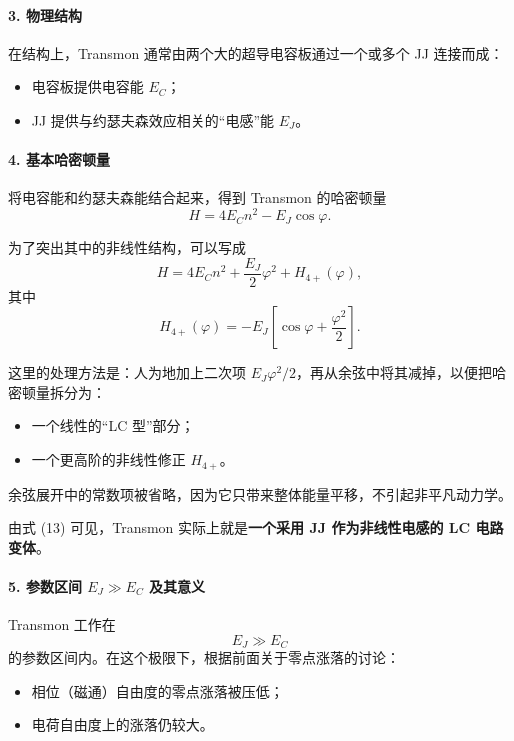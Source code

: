 \documentclass[12pt,a4paper,oneside]{ctexbook}
\begin{document}
\paragraph{3. 物理结构}

在结构上，Transmon 通常由两个大的超导电容板通过一个或多个 JJ 连接而成：
\begin{itemize}[leftmargin=2em]
    \item 电容板提供电容能 \(E_C\)；
    \item JJ 提供与约瑟夫森效应相关的“电感”能 \(E_J\)。
\end{itemize}

\paragraph{4. 基本哈密顿量}

将电容能和约瑟夫森能结合起来，得到 Transmon 的哈密顿量
\begin{equation}
    H=4E_Cn^2-E_J\cos\varphi.
    \tag{13}
\end{equation}

为了突出其中的非线性结构，可以写成
\begin{equation}
    H
    =
    4E_Cn^2+\frac{E_J}{2}\varphi^2+H_{4+}(\varphi),
    \tag{14}
\end{equation}
其中
\[
    H_{4+}(\varphi)
    =
    -E_J\left[\cos\varphi+\frac{\varphi^2}{2}\right].
\]

这里的处理方法是：人为地加上二次项 \(E_J\varphi^2/2\)，再从余弦中将其减掉，以便把哈密顿量拆分为：
\begin{itemize}[leftmargin=2em]
    \item 一个线性的“LC 型”部分；
    \item 一个更高阶的非线性修正 \(H_{4+}\)。
\end{itemize}

余弦展开中的常数项被省略，因为它只带来整体能量平移，不引起非平凡动力学。

由式 (13) 可见，Transmon 实际上就是\textbf{一个采用 JJ 作为非线性电感的 LC 电路变体}。

\paragraph{5. 参数区间 \(E_J\gg E_C\) 及其意义}

Transmon 工作在
\[
    E_J\gg E_C
\]
的参数区间内。在这个极限下，根据前面关于零点涨落的讨论：
\begin{itemize}[leftmargin=2em]
    \item 相位（磁通）自由度的零点涨落被压低；
    \item 电荷自由度上的涨落仍较大。
\end{itemize}
\end{document}
